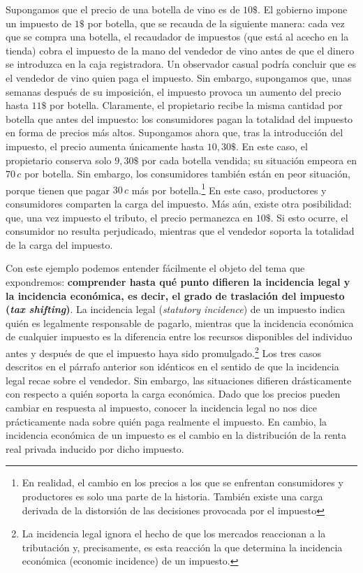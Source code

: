 \documentclass[10pt,a4paper]{article}
\begin{document}
Supongamos que el precio de una botella de vino es de $10\$$. El gobierno impone un impuesto de $1\$$ por botella, que se recauda de la siguiente manera: cada vez que se compra una botella, el recaudador de impuestos (que está al acecho en la tienda) cobra el impuesto de la mano del vendedor de vino antes de que el dinero se introduzca en la caja registradora. Un observador casual podría concluir que es el vendedor de vino quien paga el impuesto. Sin embargo, supongamos que, unas semanas después de su imposición, el impuesto provoca un aumento del precio hasta $11\$$ por botella. Claramente, el propietario recibe la misma cantidad por botella que antes del impuesto: los consumidores pagan la totalidad del impuesto en forma de precios más altos. Supongamos ahora que, tras la introducción del impuesto, el precio aumenta únicamente hasta $10,30\$$. En este caso, el propietario conserva solo $9,30\$$ por cada botella vendida; su situación empeora en $70\,c$ por botella. Sin embargo, los consumidores también están en peor situación, porque tienen que pagar $30\,c$ más por botella.\footnote{%
    En realidad, el cambio en los precios a los que se enfrentan consumidores y productores es solo una parte de la historia. También existe una carga derivada de la distorsión de las decisiones provocada por el impuesto
} En este caso, productores y consumidores comparten la carga del impuesto. Más aún, existe otra posibilidad: que, una vez impuesto el tributo, el precio permanezca en $10\$$. Si esto ocurre, el consumidor no resulta perjudicado, mientras que el vendedor soporta la totalidad de la carga del impuesto.

Con este ejemplo podemos entender fácilmente el objeto del tema que expondremos: \textbf{comprender hasta qué punto difieren la incidencia legal y la incidencia económica, es decir, el grado de traslación del impuesto (\textit{tax shifting})}. La incidencia legal (\textit{statutory incidence}) de un impuesto indica quién es legalmente responsable de pagarlo, mientras que la incidencia económica de cualquier impuesto es la diferencia entre los recursos disponibles del individuo antes y después de que el impuesto haya sido promulgado.\footnote{%
    La incidencia legal ignora el hecho de que los mercados reaccionan a la tributación y, precisamente, es esta reacción la que determina la incidencia económica (economic incidence) de un impuesto.
} Los tres casos descritos en el párrafo anterior son idénticos en el sentido de que la incidencia legal recae sobre el vendedor. Sin embargo, las situaciones difieren drásticamente con respecto a quién soporta la carga económica. Dado que los precios pueden cambiar en respuesta al impuesto, conocer la incidencia legal no nos dice prácticamente nada sobre quién paga realmente el impuesto. En cambio, la incidencia económica de un impuesto es el cambio en la distribución de la renta real privada inducido por dicho impuesto.
\end{document}
